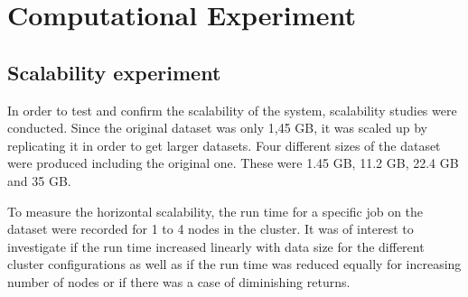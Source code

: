 \section{Computational Experiment}


\subsection{Scalability experiment}
In order to test and confirm the scalability of the system, scalability studies were conducted. Since the original dataset was only 1,45 GB, it was scaled up by replicating it in order to get larger datasets. Four different sizes of the dataset were produced including the original one. These were 1.45 GB, 11.2 GB, 22.4 GB and 35 GB. 

To measure the horizontal scalability, the run time for a specific job on the dataset were recorded for 1 to 4 nodes in the cluster. It was of interest to investigate if the run time increased linearly with data size for the different cluster configurations as well as if the run time was reduced equally for increasing number of nodes or if there was a case of diminishing returns.